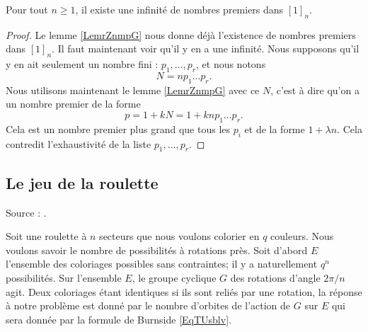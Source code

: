 \begin{theorem}    \label{ThoxwTjcl}   
    Pour tout \( n\geq 1\), il existe une infinité de nombres premiers dans \( [1]_n\).
\end{theorem}

\begin{proof}
    Le lemme \ref{LemrZnmpG} nous donne déjà l'existence de nombres premiers dans \( [1]_n\). Il faut maintenant voir qu'il y en a une infinité. Nous supposons qu'il y en ait seulement un nombre fini : \( p_1,\ldots, p_r\), et nous notons 
    \begin{equation}
        N=np_1\ldots p_r.
    \end{equation}
    Nous utilisons maintenant le lemme \ref{LemrZnmpG} avec ce \( N\), c'est à dire qu'on a un nombre premier de la forme
    \begin{equation}
        p=1+kN=1+knp_1\ldots p_r.
    \end{equation}
    Cela est un nombre premier plus grand que tous les \( p_i\) et de la forme \( 1+\lambda n\). Cela contredit l'exhaustivité de la liste \( p_1,\ldots, p_r\).
\end{proof}

\subsection{Le jeu de la roulette}
\label{pTqJLY}

Source : \cite{HEBOFl}.

Soit une roulette à \( n\) secteurs que nous voulons colorier en \( q\) couleurs. Nous voulons savoir le nombre de possibilités à rotations près. Soit d'abord \( E\) l'ensemble des coloriages possibles sans contraintes; il y a naturellement \( q^n\) possibilités. Sur l'ensemble \( E\), le groupe cyclique \( G\) des rotations d'angle \( 2\pi/n\) agit. Deux coloriages étant identiques si ils sont reliés par une rotation, la réponse à notre problème est donné par le nombre d'orbites de l'action de \( G\) sur \( E\) qui sera donnée par la formule de Burnside \ref{EqTUsblv}. 

